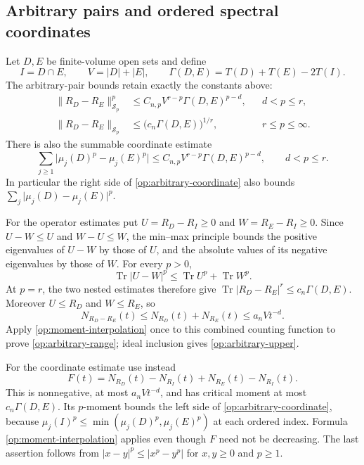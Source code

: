 \documentclass[11pt,reqno]{amsart}
\numberwithin{equation}{section}
\newcommand{\abs}[1]{\lvert#1\rvert}
\newcommand{\norm}[1]{\lVert#1\rVert}
\DeclareMathOperator{\Tr}{Tr}
\begin{document}
\subsection{Arbitrary pairs and ordered spectral coordinates}
\label{op:arbitrary-pairs}

Let $D,E$ be finite-volume open sets and define
\begin{equation}\label{op:overlap-def}
 I=D\cap E,\qquad V=\abs D+\abs E,\qquad
 \Gamma(D,E)=T(D)+T(E)-2T(I).
\end{equation}
The arbitrary-pair bounds retain exactly the constants above:
\begin{align}
 \norm{R_D-R_E}_{\mathcal S_p}^{p}
 &\le C_{n,p}V^{r-p}\Gamma(D,E)^{p-d},&&d<p\le r,
 \label{op:arbitrary-range}\\
 \norm{R_D-R_E}_{\mathcal S_p}
 &\le\bigl(c_n\Gamma(D,E)\bigr)^{1/r},&&r\le p\le\infty.
 \label{op:arbitrary-upper}
\end{align}
There is also the summable coordinate estimate
\begin{equation}\label{op:arbitrary-coordinate}
 \sum_{j\ge1}\abs{\mu_j(D)^p-\mu_j(E)^p}
 \le C_{n,p}V^{r-p}\Gamma(D,E)^{p-d},\qquad d<p\le r.
\end{equation}
In particular the right side of \eqref{op:arbitrary-coordinate}
also bounds $\sum_j\abs{\mu_j(D)-\mu_j(E)}^p$.

For the operator estimates put
$U=R_D-R_I\ge0$ and $W=R_E-R_I\ge0$.
Since $U-W\le U$ and $W-U\le W$, the min--max principle bounds
the positive eigenvalues of $U-W$ by those of $U$, and the absolute
values of its negative eigenvalues by those of $W$.  For every $p>0$,
\begin{equation}\label{op:positive-negative}
 \Tr\abs{U-W}^p\le\Tr U^p+\Tr W^p.
\end{equation}
At $p=r$, the two nested estimates therefore give
$\Tr\abs{R_D-R_E}^r\le c_n\Gamma(D,E)$.
Moreover $U\le R_D$ and $W\le R_E$, so
\[
 N_{R_D-R_E}(t)\le N_{R_D}(t)+N_{R_E}(t)
                  \le a_nVt^{-d}.
\]
Apply \eqref{op:moment-interpolation} once to this combined counting
function to prove \eqref{op:arbitrary-range}; ideal inclusion gives
\eqref{op:arbitrary-upper}.

For the coordinate estimate use instead
\[
 F(t)=N_{R_D}(t)-N_{R_I}(t)
      +N_{R_E}(t)-N_{R_I}(t).
\]
This is nonnegative, at most $a_nVt^{-d}$, and has critical moment
at most $c_n\Gamma(D,E)$.  Its $p$-moment bounds the left side of
\eqref{op:arbitrary-coordinate}, because
$\mu_j(I)^p\le\min(\mu_j(D)^p,\mu_j(E)^p)$ at each ordered
index.  Formula \eqref{op:moment-interpolation} applies even though
$F$ need not be decreasing.  The last assertion follows from
$\abs{x-y}^p\le\abs{x^p-y^p}$ for $x,y\ge0$ and $p\ge1$.
\end{document}
